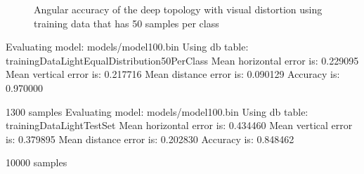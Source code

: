 
\hspace{-8mm}
\begin{figure}[H]
\caption{Angular accuracy of the deep topology with visual distortion using training data that has 50 samples per class}
\label{fig:angular-acc}
\end{figure}






Evaluating model: models/model100.bin
Using db table: trainingDataLightEqualDistribution50PerClass
Mean horizontal error is: 0.229095
Mean vertical error is: 0.217716
Mean distance error is: 0.090129
Accuracy is: 0.970000



1300 samples
Evaluating model: models/model100.bin
Using db table: trainingDataLightTestSet
Mean horizontal error is: 0.434460
Mean vertical error is: 0.379895
Mean distance error is: 0.202830
Accuracy is: 0.848462



10000 samples








































